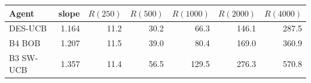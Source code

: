\begin{tabular}{lrrrrrr}
\toprule
Agent & slope & $R(250)$ & $R(500)$ & $R(1000)$ & $R(2000)$ & $R(4000)$ \\
\midrule
DES-UCB & 1.164 & 11.2 & 30.2 & 66.3 & 146.1 & 287.5 \\
B4 BOB & 1.207 & 11.5 & 39.0 & 80.4 & 169.0 & 360.9 \\
B3 SW-UCB & 1.357 & 11.4 & 56.5 & 129.5 & 276.3 & 570.8 \\
\bottomrule
\end{tabular}